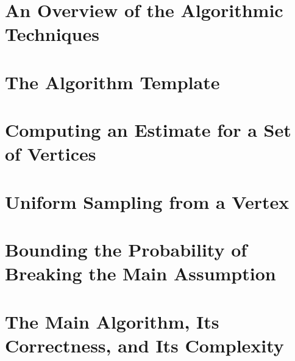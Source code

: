 \documentclass[11pt,twoside=off,numbers=noenddot]{scrbook}
\begin{document}
\section{An Overview of the Algorithmic Techniques}

\section{The Algorithm Template}

\section{Computing an Estimate for a Set of Vertices}

\section{Uniform Sampling from a Vertex}

\section{Bounding the Probability of Breaking the Main Assumption}

\section{The Main Algorithm, Its Correctness, and Its Complexity}

\printbibliography[nottype=image]
\end{document}
